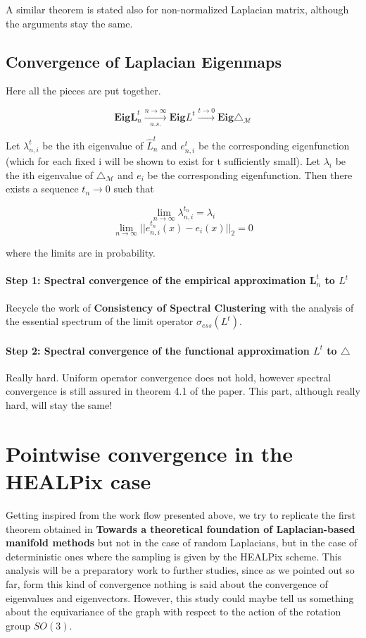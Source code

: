 A similar theorem is stated also for non-normalized Laplacian matrix, although the arguments stay the same.
\subsection{Convergence of Laplacian Eigenmaps}
Here all the pieces are put together. 

 $$ \mathbf{Eig} \mathbf{ L}^t_n \xrightarrow[a.s.]{n\to\infty} \mathbf{Eig} L^t \xrightarrow{t\to0} \mathbf{Eig} \triangle_\mathcal M $$
 
 \begin{theorem}
 	Let $\lambda_{n,i}^t$ be the ith eigenvalue of $\hat L_n^t$ and $e^t_{n,i}$ be the corresponding eigenfunction (which for each fixed i will be shown to exist for t sufficiently small). Let $\lambda_{i}$ be the ith eigenvalue of $\triangle_\mathcal M$ and $e_{i}$ be the corresponding eigenfunction. Then there exists a sequence $t_n\rightarrow 0$ such that
 	
 	$$\lim_{n\rightarrow\infty} \lambda_{n,i}^{t_n}=\lambda_i$$
 	$$\lim_{n\rightarrow\infty}||e_{n,i}^{t_n}(x) - e_i(x)||_2 = 0$$
 	
 	where the limits are in probability.
 	
 \end{theorem}

\paragraph{Step 1: Spectral convergence of the empirical approximation $\mathbf{ L}_n^t$ to $L^t$}
Recycle the work of \textbf{Consistency of Spectral Clustering} with the analysis of the essential spectrum of the limit operator $\sigma_{ess}(L^t)$.
\paragraph{Step 2: Spectral convergence of the functional approximation $L^t$ to $\triangle$}
Really hard. Uniform operator convergence does not hold, however spectral convergence is still assured in theorem 4.1 of the paper. This part, although really hard, will stay the same!


\section{Pointwise convergence in the HEALPix case}

Getting inspired from the work flow presented above, we try to replicate the first theorem obtained in \textbf{Towards a theoretical foundation of Laplacian-based manifold methods} but not in the case of random Laplacians, but in the case of deterministic ones where the sampling is given by the HEALPix scheme. This analysis will be a preparatory work to further studies, since as we pointed out so far, form this kind of convergence nothing is said about the convergence of eigenvalues and eigenvectors. However, this study could maybe tell us something about the equivariance of the graph with respect to the action of the rotation group $SO(3)$.


